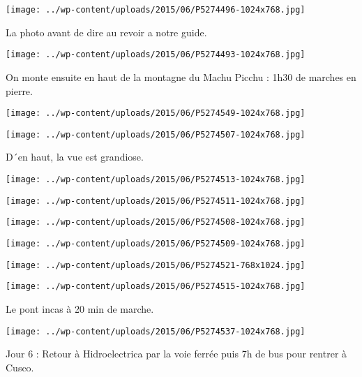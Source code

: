  \newline
 \newline
\centerline{\texttt{[image: ../wp-content/uploads/2015/06/P5274496-1024x768.jpg]} } 
 \newline
 La photo avant de dire au revoir a notre guide. \newline
 \newline
\centerline{\texttt{[image: ../wp-content/uploads/2015/06/P5274493-1024x768.jpg]} } 
 \newline
 On monte ensuite en haut de la montagne du Machu Picchu : 1h30 de marches en pierre. \newline
 \newline
\centerline{\texttt{[image: ../wp-content/uploads/2015/06/P5274549-1024x768.jpg]} } 
 \newline
 \newline
\centerline{\texttt{[image: ../wp-content/uploads/2015/06/P5274507-1024x768.jpg]} } 
 \newline
 D´en haut, la vue est grandiose. \newline
 \newline
\centerline{\texttt{[image: ../wp-content/uploads/2015/06/P5274513-1024x768.jpg]} } 
 \newline
 \newline
\centerline{\texttt{[image: ../wp-content/uploads/2015/06/P5274511-1024x768.jpg]} } 
 \newline
 \newline
\centerline{\texttt{[image: ../wp-content/uploads/2015/06/P5274508-1024x768.jpg]} } 
 \newline
 \newline
\centerline{\texttt{[image: ../wp-content/uploads/2015/06/P5274509-1024x768.jpg]} } 
 \newline
 \newline
\centerline{\texttt{[image: ../wp-content/uploads/2015/06/P5274521-768x1024.jpg]} } 
 \newline
 \newline
\centerline{\texttt{[image: ../wp-content/uploads/2015/06/P5274515-1024x768.jpg]} } 
 \newline
 Le pont incas à 20 min de marche. \newline
 \newline
\centerline{\texttt{[image: ../wp-content/uploads/2015/06/P5274537-1024x768.jpg]} } 
 \newline
 Jour 6 : \newline
 Retour à Hidroelectrica par la voie ferrée puis 7h de bus pour rentrer à Cusco. \newline

\newpage
 
